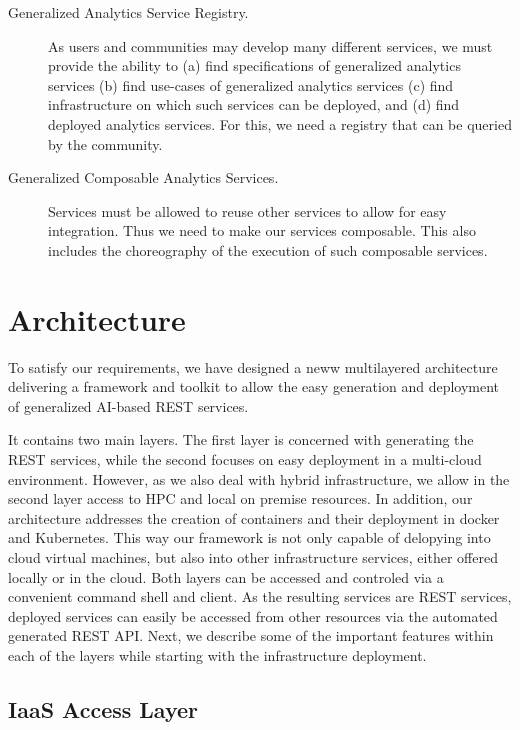 \begin{description}
\item[Generalized Analytics Service Registry.]
As users and communities may develop many different services, we must
provide the ability to (a) find specifications of generalized
analytics services (b) find use-cases of generalized analytics
services (c) find infrastructure on which such services can be
deployed, and (d) find deployed analytics services. For this, we need
a registry that can be queried by the community.

\item[Generalized Composable Analytics Services.]
Services must be allowed to reuse other services to allow for easy
integration. Thus we need to make our services composable. This also
includes the choreography of the execution of such composable
services.


\end{description}

\section{Architecture}
\label{sec:architecture}

To satisfy our requirements, we have designed a neww multilayered
architecture delivering a framework and toolkit to allow the easy
generation and deployment of generalized AI-based REST services.

It contains two main layers. The first layer is concerned with
generating the REST services, while the second focuses on easy
deployment in a multi-cloud environment. However, as we also deal with
hybrid infrastructure, we allow in the second layer access to HPC and
local on premise resources. In addition, our architecture addresses
the creation of containers and their deployment in docker and
Kubernetes. This way our framework is not only capable of delopying
into cloud virtual machines, but also into other infrastructure
services, either offered locally or in the cloud. Both layers can be
accessed and controled via a convenient command shell and client. As
the resulting services are REST services, deployed services can easily
be accessed
from other resources via the automated generated REST API.
Next, we describe some of the
important features within each of the layers while starting with the
infrastructure deployment.

\subsection{IaaS Access Layer}

